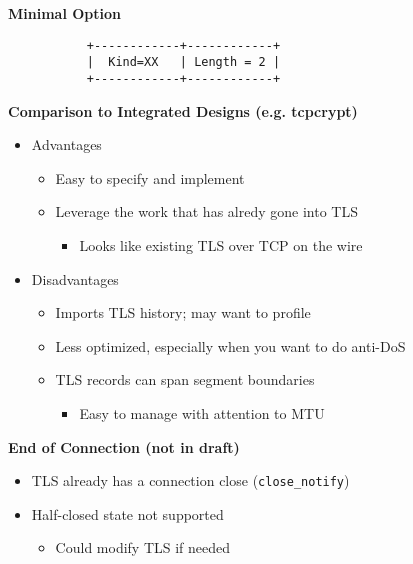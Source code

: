 \documentclass[helvetica]{seminar}
\newcommand{\heading}[1]{%
  \begin{center} 
    \large\bf 
    #1 
  \end{center} 
  \vspace{.4 in}}
\begin{document}
\begin{slide}
\heading{Minimal Option}

\begin{verbatim}
           +------------+------------+
           |  Kind=XX   | Length = 2 |
           +------------+------------+
\end{verbatim}
\end{slide}


\begin{slide}
\heading{Comparison to Integrated Designs (e.g. tcpcrypt)}

\begin{itemize}
\item Advantages
  \begin{itemize}
  \item Easy to specify and implement
  \item Leverage the work that has alredy gone into TLS 
    \begin{itemize}
    \item Looks like existing TLS over TCP on the wire
    \end{itemize}
\end{itemize}

\item Disadvantages
\begin{itemize}
\item Imports TLS history; may want to profile
\item Less optimized, especially when you want to do anti-DoS
\item TLS records can span segment boundaries 
  \begin{itemize}
  \item Easy to manage with attention to MTU
  \end{itemize}
\end{itemize}
\end{itemize}
\end{slide}

\begin{slide}
\heading{End of Connection (not in draft)}

\begin{itemize}
\item TLS already has a connection close (\verb^close_notify^)
\item Half-closed state not supported
  \begin{itemize}
  \item Could modify TLS if needed
  \end{itemize}
\end{itemize}
\end{slide}
\end{document}
